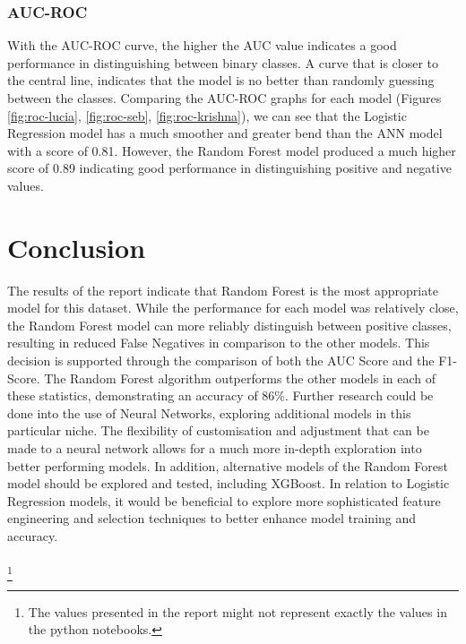 \documentclass[10pt]{article}
\begin{document}
\subsubsection{AUC-ROC}
With the AUC-ROC curve, the higher the AUC value indicates a good performance in distinguishing between binary classes. A curve that is closer to the central line, indicates that the model is no better than randomly guessing between the classes. Comparing the AUC-ROC graphs for each model (Figures \ref{fig:roc-lucia}, \ref{fig:roc-seb}, \ref{fig:roc-krishna}), we can see that the Logistic Regression model has a much smoother and greater bend than the ANN model with a score of 0.81. However, the Random Forest model produced a much higher score of 0.89 indicating good performance in distinguishing positive and negative values.

\section{Conclusion}
The results of the report indicate that Random Forest is the most appropriate model for this dataset. While the performance for each model was relatively close, the Random Forest model can more reliably distinguish between positive classes, resulting in reduced False Negatives in comparison to the other models. This decision is supported through the comparison of both the AUC Score and the F1-Score. The Random Forest algorithm outperforms the other models in each of these statistics, demonstrating an accuracy of 86\%. Further research could be done into the use of Neural Networks, exploring additional models in this particular niche. The flexibility of customisation and adjustment that can be made to a neural network allows for a much more in-depth exploration into better performing models. In addition, alternative models of the Random Forest model should be explored and tested, including XGBoost. In relation to Logistic Regression models, it would be beneficial to explore more sophisticated feature engineering and selection techniques to better enhance model training and accuracy.
\\\\
\footnote{The values presented in the report might not represent exactly the values in the python notebooks.}




\end{document}
